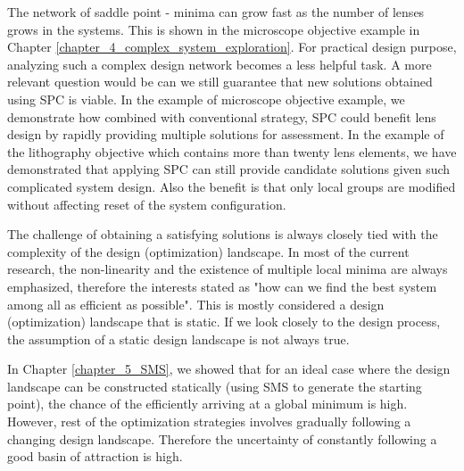 The network of saddle point - minima can grow fast as the number of lenses grows in the systems. This is shown in the microscope objective example in Chapter \ref{chapter_4_complex_system_exploration}. For practical design purpose, analyzing such a complex design network becomes a less helpful task. A more relevant question would be can we still guarantee that new solutions obtained using SPC is viable.
In the example of microscope objective example, we demonstrate how combined with conventional strategy, SPC could benefit lens design by rapidly providing multiple solutions for assessment. In the example of the lithography objective which contains more than twenty lens elements, we have demonstrated that applying SPC can still provide candidate solutions given such complicated system design. Also the benefit is that only local groups are modified without affecting reset of the system configuration. 

The challenge of obtaining a satisfying solutions is always closely tied with the complexity of the design (optimization) landscape. In most of the current research, the non-linearity and the existence of multiple local minima are always emphasized, therefore the interests stated as "how can we find the best system among all as efficient as possible". This is mostly considered a design (optimization) landscape that is static. If we look closely to the design process, the assumption of a static design landscape is not always true. 

% 
In Chapter \ref{chapter_5_SMS}, we showed that for an ideal case where the design landscape can be constructed statically (using SMS to generate the starting point), the chance of the efficiently arriving at a global minimum is high. However, rest of the optimization strategies involves gradually following a changing design landscape. Therefore the uncertainty of constantly following a good basin of attraction is high. 

